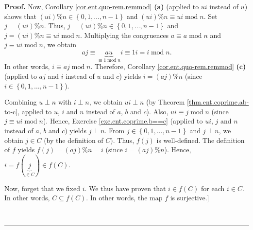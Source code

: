 \documentclass[numbers=enddot,12pt,final,onecolumn,notitlepage]{scrartcl}%
\numberwithin{exer}{subsection}
\theoremstyle{definition}
\newenvironment{proof}[1][Proof]{\noindent\textbf{#1.} }{\ \rule{0.5em}{0.5em}}
\begin{document}
\begin{proof}
Now, Corollary \ref{cor.ent.quo-rem.remmod} \textbf{(a)} (applied to $ui$
instead of $u$) shows that $\left(  ui\right)  \%n\in\left\{  0,1,\ldots
,n-1\right\}  $ and $\left(  ui\right)  \%n\equiv ui\operatorname{mod}n$. Set
$j=\left(  ui\right)  \%n$. Thus, $j=\left(  ui\right)  \%n\in\left\{
0,1,\ldots,n-1\right\}  $ and $j=\left(  ui\right)  \%n\equiv
ui\operatorname{mod}n$. Multiplying the congruences $a\equiv
a\operatorname{mod}n$ and $j\equiv ui\operatorname{mod}n$, we obtain%
\[
aj\equiv\underbrace{au}_{\equiv1\operatorname{mod}n}i\equiv
1i=i\operatorname{mod}n.
\]
In other words, $i\equiv aj\operatorname{mod}n$. Therefore, Corollary
\ref{cor.ent.quo-rem.remmod} \textbf{(c)} (applied to $aj$ and $i$ instead of
$u$ and $c$) yields $i=\left(  aj\right)  \%n$ (since $i\in\left\{
0,1,\ldots,n-1\right\}  $).

Combining $u\perp n$ with $i\perp n$, we obtain $ui\perp n$ (by Theorem
\ref{thm.ent.coprime.ab-to-c}, applied to $u$, $i$ and $n$ instead of $a$, $b$
and $c$). Also, $ui\equiv j\operatorname{mod}n$ (since $j\equiv
ui\operatorname{mod}n$). Hence, Exercise \ref{exe.ent.coprime.b==c} (applied
to $ui$, $j$ and $n$ instead of $a$, $b$ and $c$) yields $j\perp n$. From
$j\in\left\{  0,1,\ldots,n-1\right\}  $ and $j\perp n$, we obtain $j\in C$ (by
the definition of $C$). Thus, $f\left(  j\right)  $ is well-defined. The
definition of $f$ yields $f\left(  j\right)  =\left(  aj\right)  \%n=i$ (since
$i=\left(  aj\right)  \%n$). Hence, $i=f\left(  \underbrace{j}_{\in C}\right)
\in f\left(  C\right)  $.

Now, forget that we fixed $i$. We thus have proven that $i\in f\left(
C\right)  $ for each $i\in C$. In other words, $C\subseteq f\left(  C\right)
$. In other words, the map $f$ is surjective.]


\end{proof}
\end{document}
